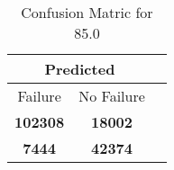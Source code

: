 \begin{table}[] 
\label{Table: Prediction Accuracy-DMD85.0OnlySunEKF-combinationReflection-Reflection} 
\caption{Confusion Matric for 85.0} 
\centering 
\begin{tabular} 
 {@{}ccc@{}} 
\toprule 
\multicolumn{2}{c}{\textbf{Predicted}}
 \\ \midrule 
\multicolumn{1}{|c|}{Failure} & 
\multicolumn{1}{c|}{No Failure}
 \\ \midrule 
\multicolumn{1}{|c|}{\color{green}\textbf{102308}} & 
\multicolumn{1}{c|}{\color{red}\textbf{18002}}
 \\ \midrule 
\multicolumn{1}{|c|}{\color{red}\textbf{7444}} & 
\multicolumn{1}{c|}{\color{green}\textbf{42374}}
 \\ \bottomrule 
\end{tabular} 
\end{table} 
